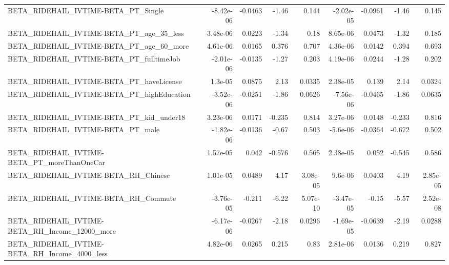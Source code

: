 \begin{tabular}{lrrrrrrrr}
BETA\_RIDEHAIL\_IVTIME-BETA\_PT\_Single                &   -8.42e-06 &      -0.0463 &    -1.46 &    0.144 &  -2.02e-05 &     -0.0961 &        -1.46 &         0.145 \\
BETA\_RIDEHAIL\_IVTIME-BETA\_PT\_age\_35\_less           &    3.48e-06 &       0.0223 &    -1.34 &     0.18 &   8.65e-06 &      0.0473 &        -1.32 &         0.185 \\
BETA\_RIDEHAIL\_IVTIME-BETA\_PT\_age\_60\_more           &    4.61e-06 &       0.0165 &    0.376 &    0.707 &   4.36e-06 &      0.0142 &        0.394 &         0.693 \\
BETA\_RIDEHAIL\_IVTIME-BETA\_PT\_fulltimeJob           &   -2.01e-06 &      -0.0135 &    -1.27 &    0.203 &   4.19e-06 &      0.0244 &        -1.28 &         0.202 \\
BETA\_RIDEHAIL\_IVTIME-BETA\_PT\_haveLicense           &     1.3e-05 &       0.0875 &     2.13 &   0.0335 &   2.38e-05 &       0.139 &         2.14 &        0.0324 \\
BETA\_RIDEHAIL\_IVTIME-BETA\_PT\_highEducation         &   -3.52e-06 &      -0.0251 &    -1.86 &   0.0626 &  -7.56e-06 &     -0.0465 &        -1.86 &        0.0635 \\
BETA\_RIDEHAIL\_IVTIME-BETA\_PT\_kid\_under18           &    3.23e-06 &       0.0171 &   -0.235 &    0.814 &   3.27e-06 &      0.0148 &       -0.233 &         0.816 \\
BETA\_RIDEHAIL\_IVTIME-BETA\_PT\_male                  &   -1.82e-06 &      -0.0136 &    -0.67 &    0.503 &   -5.6e-06 &     -0.0364 &       -0.672 &         0.502 \\
BETA\_RIDEHAIL\_IVTIME-BETA\_PT\_moreThanOneCar        &    1.57e-05 &        0.042 &   -0.576 &    0.565 &   2.38e-05 &       0.052 &       -0.545 &         0.586 \\
BETA\_RIDEHAIL\_IVTIME-BETA\_RH\_Chinese               &    1.01e-05 &       0.0489 &     4.17 & 3.08e-05 &    9.6e-06 &      0.0403 &         4.19 &      2.85e-05 \\
BETA\_RIDEHAIL\_IVTIME-BETA\_RH\_Commute               &   -3.76e-05 &       -0.211 &    -6.22 & 5.07e-10 &  -3.47e-05 &       -0.15 &        -5.57 &      2.52e-08 \\
BETA\_RIDEHAIL\_IVTIME-BETA\_RH\_Income\_12000\_more     &   -6.17e-06 &      -0.0267 &    -2.18 &   0.0296 &  -1.69e-05 &     -0.0639 &        -2.19 &        0.0288 \\
BETA\_RIDEHAIL\_IVTIME-BETA\_RH\_Income\_4000\_less      &    4.82e-06 &       0.0265 &    0.215 &     0.83 &   2.81e-06 &      0.0136 &        0.219 &         0.827 \\

\end{tabular}
